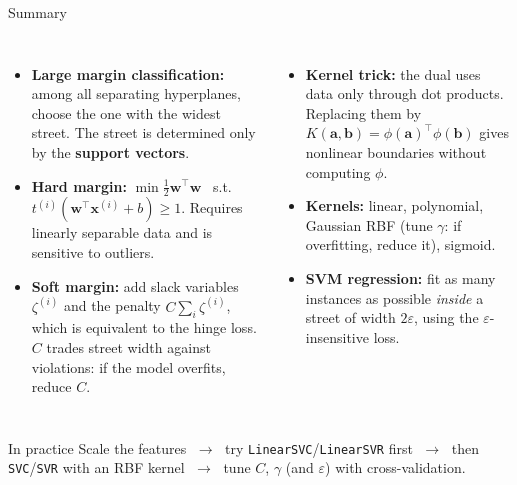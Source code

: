 \documentclass[aspectratio=169,10pt]{beamer}
\newcommand{\w}{\mathbf{w}}
\newcommand{\x}{\mathbf{x}}
\begin{document}
\begin{frame}{Summary}
\small
\begin{columns}[T]
\begin{itemize}
  \item \textbf{Large margin classification:} among all separating hyperplanes, choose the one with the widest street. The street is determined only by the \textbf{support vectors}.
  \item \textbf{Hard margin:} $\min \tfrac12\w^\top\w$ \ s.t.\ $t^{(i)}(\w^\top\x^{(i)}+b)\ge1$. Requires linearly separable data and is sensitive to outliers.
  \item \textbf{Soft margin:} add slack variables $\zeta^{(i)}$ and the penalty $C\sum_i\zeta^{(i)}$, which is equivalent to the hinge loss. $C$ trades street width against violations: if the model overfits, reduce $C$.
\end{itemize}
\begin{itemize}
  \item \textbf{Kernel trick:} the dual uses data only through dot products. Replacing them by $K(\mathbf a,\mathbf b)=\phi(\mathbf a)^\top\phi(\mathbf b)$ gives nonlinear boundaries without computing $\phi$.
  \item \textbf{Kernels:} linear, polynomial, Gaussian RBF (tune $\gamma$: if overfitting, reduce it), sigmoid.
  \item \textbf{SVM regression:} fit as many instances as possible \emph{inside} a street of width $2\varepsilon$, using the $\varepsilon$-insensitive loss.
\end{itemize}
\end{columns}
\begin{alertblock}{In practice}
Scale the features $\;\to\;$ try \texttt{LinearSVC}/\texttt{LinearSVR} first $\;\to\;$ then \texttt{SVC}/\texttt{SVR} with an RBF kernel $\;\to\;$ tune $C$, $\gamma$ (and $\varepsilon$) with cross-validation.
\end{alertblock}
\end{frame}
\end{document}
